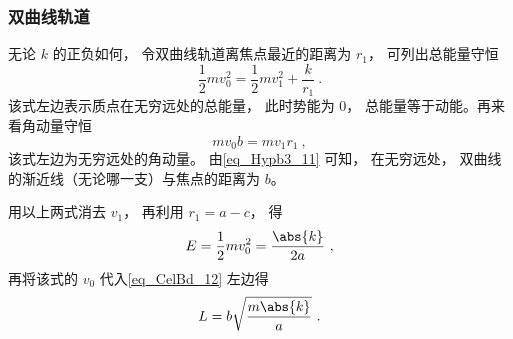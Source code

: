 \subsubsection{双曲线轨道}
无论 $k$ 的正负如何， 令双曲线轨道离焦点最近的距离为 $r_1$， 可列出总能量守恒
\begin{equation}\label{eq_CelBd_11}
\frac12 mv_0^2 = \frac12 mv_1^2 + \frac{k}{r_1}~.
\end{equation}
该式左边表示质点在无穷远处的总能量， 此时势能为 $0$， 总能量等于动能。再来看角动量守恒
\begin{equation}\label{eq_CelBd_12}
m v_0 b = m v_1 r_1~,
\end{equation}
该式左边为无穷远处的角动量。 由\autoref{eq_Hypb3_11}  可知， 在无穷远处， 双曲线的渐近线（无论哪一支）与焦点的距离为 $b$。

用以上两式消去 $v_1$， 再利用 $r_1 = a - c$， 得
\begin{equation}\label{eq_CelBd_13}
E = \frac 12 m v_0^2 = \frac{\abs{k}}{2a}~,
\end{equation}
再将该式的 $v_0$ 代入\autoref{eq_CelBd_12} 左边得
\begin{equation}
L = b\sqrt{\frac{m\abs{k}}{a}}~.
\end{equation}
